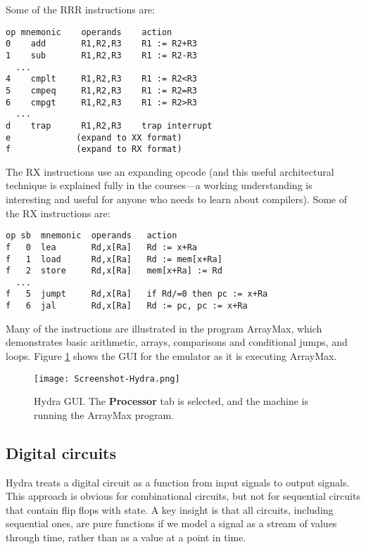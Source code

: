 \documentclass[submission,copyright,creativecommons]{eptcs}
\begin{document}
Some of the RRR instructions are:

{\footnotesize
\begin{verbatim}
op mnemonic    operands    action
0    add       R1,R2,R3    R1 := R2+R3
1    sub       R1,R2,R3    R1 := R2-R3
  ...
4    cmplt     R1,R2,R3    R1 := R2<R3
5    cmpeq     R1,R2,R3    R1 := R2=R3
6    cmpgt     R1,R2,R3    R1 := R2>R3
  ...
d    trap      R1,R2,R3    trap interrupt
e             (expand to XX format)
f             (expand to RX format)
\end{verbatim}
}

The RX instructions use an expanding opcode (and this useful
architectural technique is explained fully in the courses---a
working understanding is interesting and useful for anyone who
needs to learn about compilers).  Some of the RX instructions are:

{\footnotesize
\begin{verbatim}
op sb  mnemonic  operands   action
f   0  lea       Rd,x[Ra]   Rd := x+Ra
f   1  load      Rd,x[Ra]   Rd := mem[x+Ra]
f   2  store     Rd,x[Ra]   mem[x+Ra] := Rd
  ...
f   5  jumpt     Rd,x[Ra]   if Rd/=0 then pc := x+Ra
f   6  jal       Rd,x[Ra]   Rd := pc, pc := x+Ra
\end{verbatim}
}

Many of the instructions are illustrated in the program ArrayMax,
which demonstrates basic arithmetic, arrays, comparisons and
conditional jumps, and loops.  Figure
\ref{fig:Sigma16-processor-gui} shows the GUI for the emulator as
it is executing ArrayMax.

\begin{figure}[t]
  \begin{center}
    \texttt{[image: Screenshot-Hydra.png]}
  \end{center}
  \caption{Hydra GUI.  The \textbf{Processor} tab is selected, and
    the machine is running the ArrayMax program.}
  \label{fig:Sigma16-processor-gui}
\end{figure}

\subsection{Digital circuits}

Hydra treats a digital circuit as a function from input signals to
output signals.  This approach is obvious for combinational circuits,
but not for sequential circuits that contain flip flops with state.  A
key insight is that all circuits, including sequential ones, are pure
functions if we model a signal as a stream of values through time,
rather than as a value at a point in time.
\end{document}
